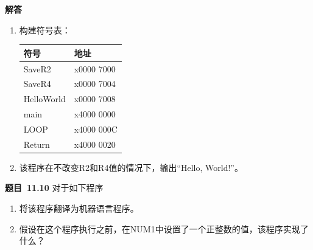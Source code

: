 \documentclass[10pt,a4paper,UTF8]{ctexart}
\newcommand{\problemname}{待定义}
\newenvironment{problem}{\begin{shaded}\par\noindent\textbf{题目\  \problemname}}{\end{shaded}\par}
\newenvironment{solution}{\par\noindent\textbf{解答}\ }{\par}
\begin{document}
\begin{solution}
	\begin{enumerate}[(1)]
		\item 构建符号表：
		\begin{table}[H]
			\centering
			\begin{tabular}{|l|l|}
			\hline
			符号         & 地址         \\ \hline
			SaveR2     & x0000 7000 \\ \hline
			SaveR4     & x0000 7004 \\ \hline
			HelloWorld & x0000 7008 \\ \hline
			main       & x4000 0000 \\ \hline
			LOOP       & x4000 000C \\ \hline
			Return     & x4000 0020 \\ \hline
			\end{tabular}
			\end{table}
		\item 该程序在不改变R2和R4值的情况下，输出“Hello, World!”。
	\end{enumerate}
\end{solution}


\renewcommand{\problemname}{11.10}
\begin{problem}
	对于如下程序
	\begin{enumerate}[(1)]
		\item 将该程序翻译为机器语言程序。
		\item 假设在这个程序执行之前，在NUM1中设置了一个正整数的值，该程序实现了什么？
	\end{enumerate}
\end{problem}
\end{document}
